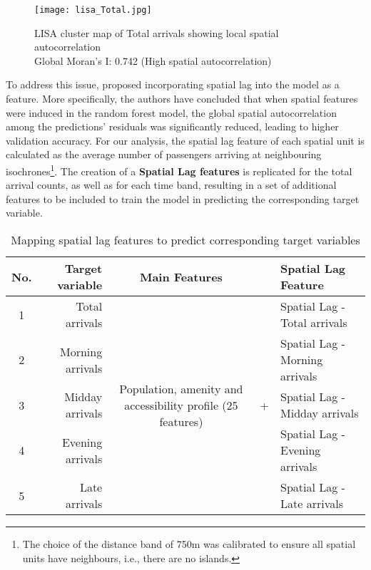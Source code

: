 \begin{figure}[ht]
    \centering
    \texttt{[image: lisa\_Total.jpg]}
    \captionsetup{justification=centering}
    \caption{LISA cluster map of Total arrivals showing local spatial autocorrelation\\Global Moran's I: 0.742 (High spatial autocorrelation)}
    \label{fig:lisacluster}
\end{figure}

To address this issue, \citet{liuIncorporatingSpatialAutocorrelation2022} proposed incorporating spatial lag into the model as a feature. More specifically, the authors have concluded that when spatial features were induced in the random forest model, the global spatial autocorrelation among the predictions' residuals was significantly reduced, leading to higher validation accuracy. For our analysis, the spatial lag feature of each spatial unit is calculated as the average number of passengers arriving at neighbouring isochrones\footnote{The choice of the distance band of 750m was calibrated to ensure all spatial units have neighbours, i.e., there are no islands.}. The creation of a \textbf{Spatial Lag features} is replicated for the total arrival counts, as well as for each time band, resulting in a set of additional features to be included to train the model in predicting the corresponding target variable.

\begin{table}[ht]
    \centering
    \renewcommand{\arraystretch}{1.5}
    \begin{tabular}{|c r || c c l|}
        \hline
        \rowcolor{lightgray}
        \textbf{No.} & \textbf{Target variable} & \textbf{Main Features} & &\textbf{Spatial Lag Feature}\\
        
        \hline
        1 & Total arrivals  &  \multirow{5}{10em}{Population, amenity and accessibility profile (25 features)} 
                                &  \multirow{5}{*}{+}       &   Spatial Lag - Total arrivals    \\ 
        2 & Morning arrivals    &                       &   &   Spatial Lag - Morning arrivals  \\ 
        3 & Midday arrivals     &                       &   &   Spatial Lag - Midday arrivals   \\ 
        4 & Evening arrivals    &                       &   &   Spatial Lag - Evening arrivals  \\ 
        5 & Late arrivals       &                       &   &   Spatial Lag - Late arrivals     \\
        \hline
    \end{tabular}
    \caption{Mapping spatial lag features to predict corresponding target variables}
    \label{tab:spatiallag}
\end{table}


